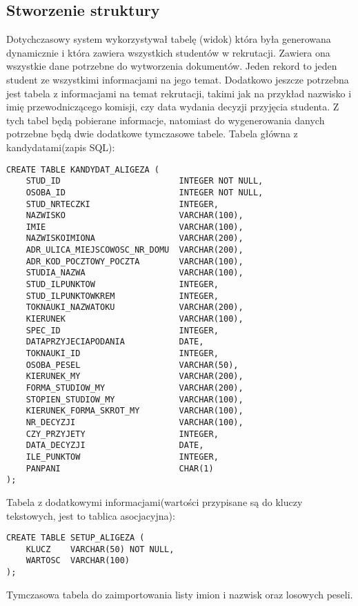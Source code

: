 \subsection{ Stworzenie struktury}

Dotychczasowy system wykorzystywał tabelę (widok) która była generowana dynamicznie i która zawiera wszystkich studentów w rekrutacji. Zawiera ona wszystkie dane potrzebne do wytworzenia dokumentów. Jeden rekord to jeden student ze wszystkimi informacjami na jego temat. Dodatkowo jeszcze potrzebna jest tabela z informacjami na temat rekrutacji, takimi jak na przykład nazwisko i imię przewodniczącego komisji, czy data wydania decyzji przyjęcia studenta. Z tych tabel będą pobierane informacje, natomiast do wygenerowania danych potrzebne będą dwie dodatkowe tymczasowe tabele.
Tabela główna z kandydatami(zapis SQL):
\begin{lstlisting}
CREATE TABLE KANDYDAT_ALIGEZA (
    STUD_ID                        INTEGER NOT NULL,
    OSOBA_ID                       INTEGER NOT NULL,
    STUD_NRTECZKI                  INTEGER,
    NAZWISKO                       VARCHAR(100),
    IMIE                           VARCHAR(100),
    NAZWISKOIMIONA                 VARCHAR(200),
    ADR_ULICA_MIEJSCOWOSC_NR_DOMU  VARCHAR(200),
    ADR_KOD_POCZTOWY_POCZTA        VARCHAR(100),
    STUDIA_NAZWA                   VARCHAR(100),
    STUD_ILPUNKTOW                 INTEGER,
    STUD_ILPUNKTOWKREM             INTEGER,
    TOKNAUKI_NAZWATOKU             VARCHAR(200),
    KIERUNEK                       VARCHAR(100),
    SPEC_ID                        INTEGER,
    DATAPRZYJECIAPODANIA           DATE,
    TOKNAUKI_ID                    INTEGER,
    OSOBA_PESEL                    VARCHAR(50),
    KIERUNEK_MY                    VARCHAR(200),
    FORMA_STUDIOW_MY               VARCHAR(200),
    STOPIEN_STUDIOW_MY             VARCHAR(100),
    KIERUNEK_FORMA_SKROT_MY        VARCHAR(100),
    NR_DECYZJI                     VARCHAR(100),
    CZY_PRZYJETY                   INTEGER,
    DATA_DECYZJI                   DATE,
    ILE_PUNKTOW                    INTEGER,
    PANPANI                        CHAR(1)
);
\end{lstlisting}
Tabela z dodatkowymi informacjami(wartości przypisane są do kluczy tekstowych, jest to tablica asocjacyjna):
\begin{lstlisting}
CREATE TABLE SETUP_ALIGEZA (
    KLUCZ    VARCHAR(50) NOT NULL,
    WARTOSC  VARCHAR(100)
);
\end{lstlisting}
Tymczasowa tabela do zaimportowania listy imion i nazwisk oraz losowych peseli.
